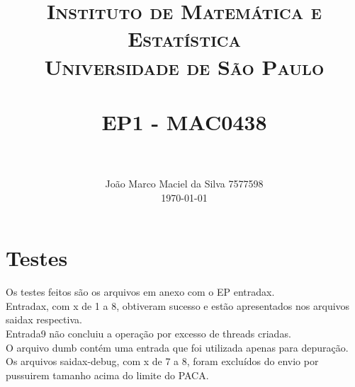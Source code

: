 \documentclass[paper=a4, fontsize=11pt]{scrartcl}
\title{
		\usefont{OT1}{bch}{b}{n}
		\normalfont \normalsize \textsc{Instituto de Matemática e Estatística\\Universidade de São Paulo} \\ [25pt]
		\horrule{0.5pt} \\[0.4cm]
		\huge EP1 - MAC0438 \\
		\horrule{2pt} \\[0.5cm]
}
\author{
		\normalfont 								\normalsize
        João Marco Maciel da Silva 7577598\\
        \normalsize
        \today
}
\date{}
\numberwithin{equation}{section}		%
\numberwithin{figure}{section}			%
\numberwithin{table}{section}				%
\begin{document}
\maketitle
\section{Testes}
Os testes feitos são os arquivos em anexo com o EP entradax.\\
Entradax, com x de 1 a 8, obtiveram sucesso e estão apresentados nos arquivos saidax respectiva.\\
Entrada9 não concluiu a operação por excesso de threads criadas.\\
O arquivo dumb contém uma entrada que foi utilizada apenas para depuração.\\
Os arquivos saidax-debug, com x de 7 a 8, foram excluídos do envio por pussuirem tamanho acima do limite do PACA.\\
\end{document}

